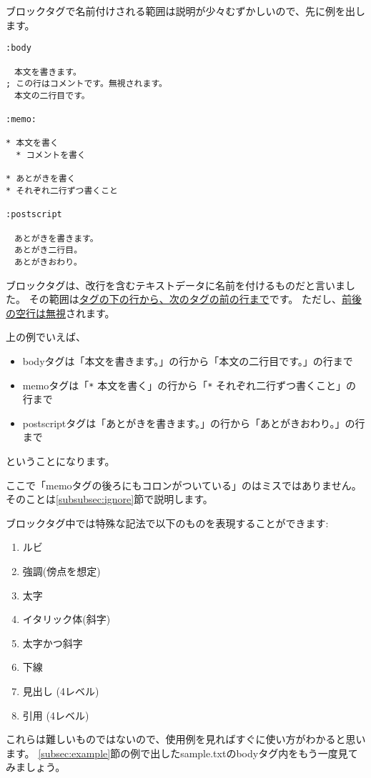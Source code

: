 \documentclass[a4j]{jsarticle}
\begin{document}
ブロックタグで名前付けされる範囲は説明が少々むずかしいので、先に例を出します。

\begin{lstlisting}[caption=ブロックタグ]
:body

　本文を書きます。
; この行はコメントです。無視されます。
　本文の二行目です。

:memo:

* 本文を書く
  * コメントを書く

* あとがきを書く
* それぞれ二行ずつ書くこと

:postscript

　あとがきを書きます。
　あとがき二行目。
　あとがきおわり。
\end{lstlisting}

ブロックタグは、改行を含むテキストデータに名前を付けるものだと言いました。
その範囲は\underline{タグの下の行から、次のタグの前の行まで}です。
ただし、\underline{前後の空行は無視}されます。

上の例でいえば、

\begin{itemize}
  \item bodyタグは「本文を書きます。」の行から「本文の二行目です。」の行まで
  \item memoタグは「\verb|*| 本文を書く」の行から「\verb|*| それぞれ二行ずつ書くこと」の行まで
  \item postscriptタグは「あとがきを書きます。」の行から「あとがきおわり。」の行まで
\end{itemize}

ということになります。

ここで「memoタグの後ろにもコロンがついている」のはミスではありません。
そのことは\ref{subsubsec:ignore}節で説明します。

ブロックタグ中では特殊な記法で以下のものを表現することができます:

\begin{enumerate}
  \item ルビ
  \item 強調(傍点を想定)
  \item 太字
  \item イタリック体(斜字)
  \item 太字かつ斜字
  \item 下線
  \item 見出し (4レベル)
  \item 引用 (4レベル)
\end{enumerate}

これらは難しいものではないので、使用例を見ればすぐに使い方がわかると思います。
\ref{subsec:example}節の例で出したsample.txtのbodyタグ内をもう一度見てみましょう。
\end{document}
